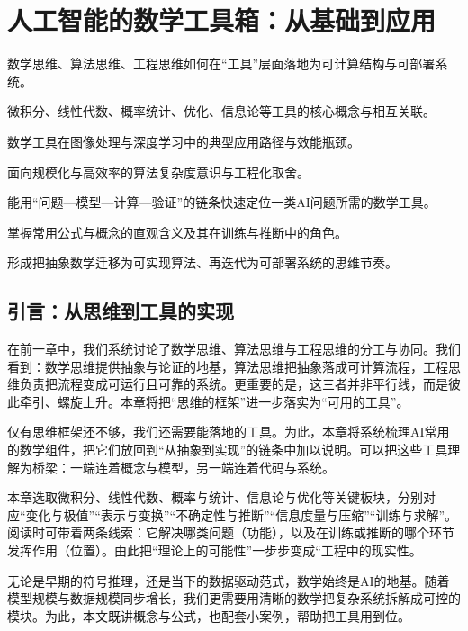 \chapter{人工智能的数学工具箱：从基础到应用}

\begin{introduction}[本章提要]
  \item 数学思维、算法思维、工程思维如何在“工具”层面落地为可计算结构与可部署系统。
  \item 微积分、线性代数、概率统计、优化、信息论等工具的核心概念与相互关联。
  \item 数学工具在图像处理与深度学习中的典型应用路径与效能瓶颈。
  \item 面向规模化与高效率的算法复杂度意识与工程化取舍。
\end{introduction}
\begin{introduction}[你将收获]
  \item 能用“问题—模型—计算—验证”的链条快速定位一类AI问题所需的数学工具。
  \item 掌握常用公式与概念的直观含义及其在训练与推断中的角色。
  \item 形成把抽象数学迁移为可实现算法、再迭代为可部署系统的思维节奏。
\end{introduction}

\section{引言：从思维到工具的实现}

在前一章中，我们系统讨论了数学思维、算法思维与工程思维的分工与协同。我们看到：数学思维提供抽象与论证的地基，算法思维把抽象落成可计算流程，工程思维负责把流程变成可运行且可靠的系统。更重要的是，这三者并非平行线，而是彼此牵引、螺旋上升。本章将把“思维的框架”进一步落实为“可用的工具”。

仅有思维框架还不够，我们还需要能落地的工具。为此，本章将系统梳理AI常用的数学组件，把它们放回到“从抽象到实现”的链条中加以说明。可以把这些工具理解为桥梁：一端连着概念与模型，另一端连着代码与系统。

本章选取微积分、线性代数、概率与统计、信息论与优化等关键板块，分别对应“变化与极值”“表示与变换”“不确定性与推断”“信息度量与压缩”“训练与求解”。阅读时可带着两条线索：它解决哪类问题（功能），以及在训练或推断的哪个环节发挥作用（位置）。由此把“理论上的可能性”一步步变成“工程中的现实性。

无论是早期的符号推理，还是当下的数据驱动范式，数学始终是AI的地基。随着模型规模与数据规模同步增长，我们更需要用清晰的数学把复杂系统拆解成可控的模块。为此，本文既讲概念与公式，也配套小案例，帮助把工具用到位。

